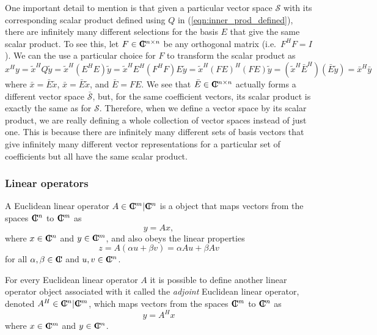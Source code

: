 One important detail to mention is that given a particular vector space
$\mathcal{S}$ with its corresponding scalar product defined using $Q$ in
(\ref{eqn:inner_prod_defined}), there are infinitely many different selections
for the basis $E$ that give the same scalar product.  To see this, let
$F\in\mbox{\textbf{C}}\hspace{-1.1ex}\mbox{l}\hspace{0.4ex}^{n\times{}n}$ be any orthogonal matrix (i.e.\ $F^H F = I$).  We can
the use a particular choice for $F$ to transform the scalar product as
%
\begin{equation}
x^H y = \tilde{x}^H Q \tilde{y}
= \tilde{x}^H ( E^H E ) \tilde{y}
= \tilde{x}^H E^H ( F^H F ) E \tilde{y}
= \tilde{x}^H ( F E )^H ( F E ) \tilde{y}
= ( \tilde{x}^H \bar{E}^H ) ( \bar{E} \tilde{y} )
= \bar{x}^H \bar{y}
\label{eqn:inner_x_y_F_E_prod}
\end{equation}
%
where $\bar{x} = {}\bar{E} {}\tilde{x}$, $\bar{x} = {}\bar{E} {}\tilde{x}$,
and $\bar{E} = F E$.  We see that $\bar{E}\in\mbox{\textbf{C}}\hspace{-1.1ex}\mbox{l}\hspace{0.4ex}^{n\times{}n}$ actually
forms a different vector space $\bar{\mathcal{S}}$, but, for the same
coefficient vectors, its scalar product is exactly the same as for
$\mathcal{S}$.  Therefore, when we define a vector space by its scalar
product, we are really defining a whole collection of vector spaces instead of
just one.  This is because there are infinitely many different sets of basis
vectors that give infinitely many different vector representations for a
particular set of coefficients but all have the same scalar product.

\subsubsection{Linear operators}

A Euclidean linear operator $A\in\mbox{\textbf{C}}\hspace{-1.1ex}\mbox{l}\hspace{0.4ex}^m|\mbox{\textbf{C}}\hspace{-1.1ex}\mbox{l}\hspace{0.4ex}^n$ is a object that maps
vectors from the spaces $\mbox{\textbf{C}}\hspace{-1.1ex}\mbox{l}\hspace{0.4ex}^n$ to $\mbox{\textbf{C}}\hspace{-1.1ex}\mbox{l}\hspace{0.4ex}^m$ as
%
\begin{equation}
y = A x,
\label{eqn:fwd_op_apply}
\end{equation}
%
where $x\in\mbox{\textbf{C}}\hspace{-1.1ex}\mbox{l}\hspace{0.4ex}^n$ and $y\in\mbox{\textbf{C}}\hspace{-1.1ex}\mbox{l}\hspace{0.4ex}^m$, and also obeys the linear properties
%
\begin{equation}
z = A(\alpha u + \beta v) = \alpha A u + \beta A v
\label{eqn:linear_op_properties}
\end{equation}
%
for all $\alpha,\beta\in\mbox{\textbf{C}}\hspace{-1.1ex}\mbox{l}\hspace{0.4ex}$ and $u,v\in\mbox{\textbf{C}}\hspace{-1.1ex}\mbox{l}\hspace{0.4ex}^n$.

For every Euclidean linear operator $A$ it is possible to define another
linear operator object associated with it called the {}\textit{adjoint}
Euclidean linear operator, denoted $A^H\in\mbox{\textbf{C}}\hspace{-1.1ex}\mbox{l}\hspace{0.4ex}^n|\mbox{\textbf{C}}\hspace{-1.1ex}\mbox{l}\hspace{0.4ex}^m$, which maps vectors
from the spaces $\mbox{\textbf{C}}\hspace{-1.1ex}\mbox{l}\hspace{0.4ex}^m$ to $\mbox{\textbf{C}}\hspace{-1.1ex}\mbox{l}\hspace{0.4ex}^n$ as
%
\begin{equation}
y = A^H x
\label{eqn:adjoint_op_apply}
\end{equation}
%
where $x\in\mbox{\textbf{C}}\hspace{-1.1ex}\mbox{l}\hspace{0.4ex}^m$ and $y\in\mbox{\textbf{C}}\hspace{-1.1ex}\mbox{l}\hspace{0.4ex}^n$.

